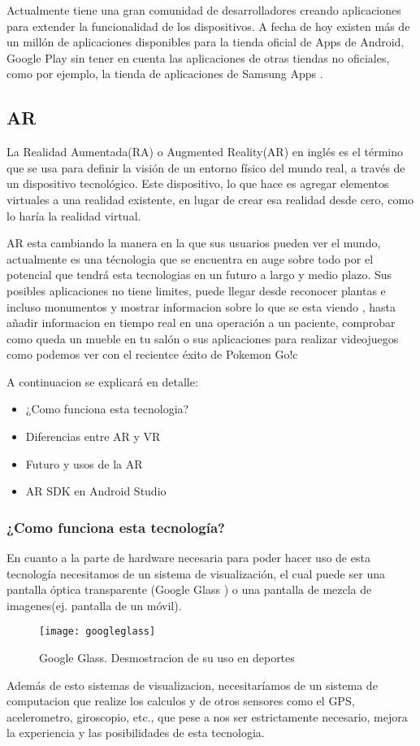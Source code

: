 Actualmente tiene una gran comunidad de desarrolladores creando aplicaciones para extender la funcionalidad de los dispositivos. A fecha de hoy existen más de un millón de aplicaciones disponibles para la tienda oficial de Apps de Android, Google Play \cite{URL::GooglePlay} sin tener en cuenta las aplicaciones de otras tiendas no oficiales, como por ejemplo, la tienda de aplicaciones de Samsung Apps \cite{URL::SamsungApps}.

\subsection{AR}

La Realidad Aumentada(RA) o Augmented Reality(AR) en inglés es el término que se usa para definir la visión de un entorno físico del mundo real, a través de un dispositivo tecnológico. Este dispositivo, lo que hace es agregar elementos virtuales a una realidad existente, en lugar de crear esa realidad desde cero, como lo haría la realidad
virtual. 

 AR esta cambiando la manera en la que sus usuarios pueden ver el mundo, actualmente es una técnologia que se encuentra en auge sobre todo por el potencial que tendrá esta tecnologias en un futuro a largo y medio plazo. Sus posibles aplicaciones no tiene limites, puede llegar desde reconocer plantas e incluso monumentos y mostrar informacion sobre lo que se esta viendo , hasta añadir informacion en tiempo real en una operación a un paciente, comprobar como queda un mueble en tu salón o sus aplicaciones para realizar videojuegos como podemos ver con el recientce éxito de Pokemon Go!c

A continuacion se explicará en detalle:
\begin{itemize}
\item ¿Como funciona esta tecnologia?
\item Diferencias entre AR y VR
\item Futuro y usos de la AR
\item AR SDK en Android Studio
\end{itemize}  

\subsubsection{¿Como funciona esta tecnología?}
	
 En cuanto a la parte de hardware necesaria para poder hacer uso de esta tecnología necesitamos de un sistema de visualización, el cual puede ser una pantalla óptica transparente (Google Glass\cite{URL::GoogleGlass} )  o una pantalla de mezcla de imagenes(ej. pantalla de un móvil). 
\begin{figure}[h]
	\centering
	\texttt{[image: googleglass]}
	\caption{Google Glass. Desmostracion de su uso en deportes}
	\label{fig:googleglass}
\end{figure}
Además de esto sistemas de visualizacion, necesitaríamos de un sistema de computacion que realize los calculos y de otros sensores como el GPS\cite{URL::gps}, acelerometro, giroscopio, etc., que pese a nos ser estrictamente necesario, mejora la experiencia y las posibilidades de esta tecnologia.

